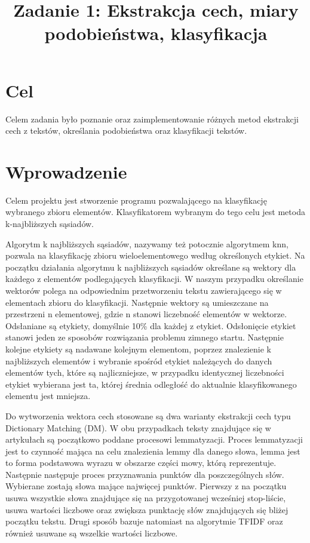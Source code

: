 \documentclass{classrep}
\author{
  \studentinfo{Stanisław Zakrzewski}{210360} \and
  \studentinfo{ Maciej Socha}{210321}
}
\title{Zadanie 1: Ekstrakcja cech, miary podobieństwa, klasyfikacja}
\begin{document}
\maketitle

\section{Cel}
Celem zadania było poznanie oraz zaimplementowanie różnych metod ekstrakcji cech z tekstów, określania podobieństwa oraz klasyfikacji tekstów.

\section{Wprowadzenie}
	Celem projektu jest stworzenie programu pozwalającego na klasyfikację  wybranego zbioru elementów. Klasyfikatorem wybranym do tego celu jest metoda k-najbliższych sąsiadów.
	
	Algorytm k najbliższych sąsiadów, nazywamy też potocznie algorytmem knn, pozwala na klasyfikację zbioru wieloelementowego według określonych etykiet. Na początku działania algorytmu k najbliższych sąsiadów określane są wektory dla każdego z elementów podlegających klasyfikacji. W naszym przypadku określanie wektorów polega na odpowiednim przetworzeniu tekstu zawierającego się w elementach zbioru do klasyfikacji. Następnie wektory są umieszczane na przestrzeni n elementowej, gdzie n stanowi liczebność elementów w wektorze. Odsłaniane są etykiety, domyślnie 10\% dla każdej z etykiet. Odsłonięcie etykiet stanowi jeden ze sposobów rozwiązania problemu zimnego startu. Następnie kolejne etykiety są nadawane kolejnym elementom, poprzez znalezienie k najbliższych elementów i wybranie spośród etykiet należących do danych elementów tych, które są najliczniejsze, w przypadku identycznej liczebności etykiet wybierana jest ta, której średnia odległość do aktualnie klasyfikowanego elementu jest mniejsza.
	
	Do wytworzenia wektora cech stosowane są dwa warianty ekstrakcji cech typu Dictionary Matching (DM). W obu przypadkach teksty znajdujące się w artykułach są początkowo poddane procesowi lemmatyzacji. Proces lemmatyzacji jest to czynność mająca na celu znalezienia lemmy dla danego słowa, lemma jest to forma podstawowa wyrazu w obszarze części mowy, którą reprezentuje. Następnie następuje proces przyznawania punktów dla poszczególnych słów. Wybierane zostają słowa mające najwięcej punktów. Pierwszy z na początku usuwa wszystkie słowa znajdujące się na przygotowanej wcześniej stop-liście, usuwa wartości liczbowe oraz zwiększa punktację słów znajdujących się bliżej początku tekstu. Drugi sposób bazuje natomiast na algorytmie TFIDF oraz również usuwane są wszelkie wartości liczbowe. 
	
\end{document}
